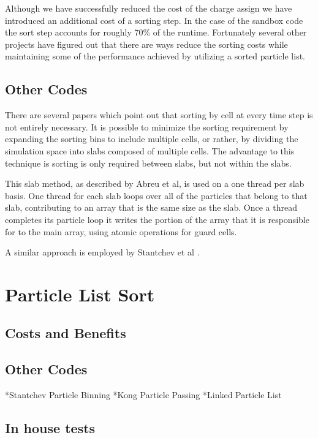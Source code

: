Although we have successfully reduced the cost of the charge assign we have introduced an additional cost of a sorting step. In the case of the sandbox code the sort step accounts for roughly 70\% of the runtime. Fortunately several other projects have figured out that there are ways reduce the sorting costs while maintaining some of the performance achieved by utilizing a sorted particle list. 

 
		\subsection{Other Codes}
There are several papers which point out that sorting by cell at every time step is not entirely necessary. It is possible to minimize the sorting requirement by expanding the sorting bins to include multiple cells, or rather, by dividing the simulation space into slabs composed of multiple cells. The advantage to this technique is sorting is only required between slabs, but not within the slabs.\cite{Abreu2011} 

This slab method, as described by Abreu et al, is used on a one thread per slab basis. One thread for each slab loops over all of the particles that belong to that slab, contributing to an array that is the same size as the slab. Once a thread completes its particle loop it writes the portion of the array that it is responsible for to the main array, using atomic operations for guard cells.\cite{Abreu2011} 

A similar approach is employed by Stantchev et al \cite{Stantchev2008}. 





	\section{Particle List Sort}
		\subsection{Costs and Benefits}
		\subsection{Other Codes}
		*Stantchev Particle Binning
		*Kong Particle Passing
		*Linked Particle List
		\subsection{In house tests}

